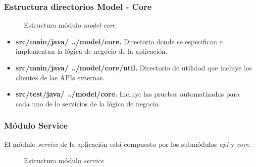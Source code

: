 \subsubsection*{Estructura directorios Model - Core}
\begin{figure}[H]
\centering
{}
\caption{Estructura módulo \textit{model-core}}
\end{figure}

\begin{itemize}
	\item \textbf{src/main/java/ ../model/core. } Directorio donde se especifican e implementan la lógica de negocio de la aplicación.
	\item \textbf{src/main/java/ ../model/core/util. } Directorio de utilidad que incluye los clientes de las APIs externas.
	\item \textbf{src/test/java/ ../model/core. } Incluye las pruebas automatizadas para cada uno de lo servicios de la lógica de negocio.
\end{itemize}


\subsubsection*{Módulo Service}
El módulo \textit{service} de la aplicación está compuesto por los submódulos \textit{api} y \textit{core}.

\begin{figure}[H]
\centering
{}
\caption{Estructura módulo \textit{service}}
\end{figure}



